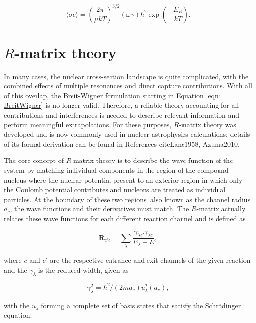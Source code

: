 \begin{equation}
\langle \sigma v \rangle = \left(  \dfrac{2 \pi}{\mu k T} \right)^{3/2} (\omega \gamma) \hbar^{2} \exp \left( - \dfrac{E_{R}}{k T} \right).
\end{equation}



\section{$R$-matrix theory}
\label{sec: r-matrix}

In many cases, the nuclear cross-section landscape is quite complicated, with the combined effects of multiple resonances and direct capture contributions. With all of this overlap, the Breit-Wigner formulation starting in Equation \ref{eqn: BreitWigner} is no longer valid. Therefore, a reliable theory accounting for all contributions and interferences is needed to describe relevant information and perform meaningful extrapolations. For these purposes, $R$-matrix theory was developed and is now commonly used in nuclear astrophysics calculations; details of its formal derivation can be found in References cite{Lane1958, Azuma2010}. 

The core concept of $R$-matrix theory is to describe the wave function of the system by matching individual components in the region of the compound nucleus where the nuclear potential present to an exterior region in which only the Coulomb potential contributes and nucleons are treated as individual particles. At the boundary of these two regions, also known as the channel radius $a_{c}$, the wave functions and their derivatives must match. The $R$-matrix actually relates these wave functions for each different reaction channel and is defined as

\begin{equation}
\mathbf{R}_{c' c} =  \sum_\lambda \frac{\gamma_{\lambda c'}\gamma_{\lambda c}}{E_\lambda-E},
\label{eqn: Rmatrix}
\end{equation}

\noindent where $c$ and $c'$ are the respective entrance and exit channels of the given reaction and the $\gamma_{\lambda}$ is the reduced width, given as

\begin{equation}
\gamma_\lambda^2 = \hbar^2/(2m a_c)u_\lambda^2(a_c),
\end{equation}

\noindent with the $u_{\lambda}$ forming a complete set of basis states that satisfy the Schr\"odinger  equation. 


